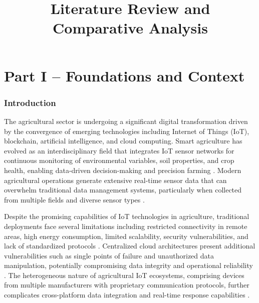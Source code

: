 \documentclass[12pt,onecolumn]{IEEEtran} %
\title{Literature Review and Comparative Analysis}
\begin{document}
\maketitle


\tableofcontents
\clearpage










\part*{Part I – Foundations and Context}

\section{Introduction}\label{sec:introduction}
The agricultural sector is undergoing a significant digital transformation driven by the convergence of emerging technologies including Internet of Things (IoT), blockchain, artificial intelligence, and cloud computing. Smart agriculture has evolved as an interdisciplinary field that integrates IoT sensor networks for continuous monitoring of environmental variables, soil properties, and crop health, enabling data-driven decision-making and precision farming \cite{dhanaraju2022smartfarminginternet, akhter2022precisionagricultureusing}. Modern agricultural operations generate extensive real-time sensor data that can overwhelm traditional data management systems, particularly when collected from multiple fields and diverse sensor types \cite{huang2025digitaltraceabilityin, irfan2025aniotdrivensmart}.

Despite the promising capabilities of IoT technologies in agriculture, traditional deployments face several limitations including restricted connectivity in remote areas, high energy consumption, limited scalability, security vulnerabilities, and lack of standardized protocols \cite{bayih2022utilizationofinternet, quy2022iotenabledsmartagriculture, jaliyagoda2023internetofthings}. Centralized cloud architectures present additional vulnerabilities such as single points of failure and unauthorized data manipulation, potentially compromising data integrity and operational reliability \cite{aliyu2023blockchainbasedsmartfarm}. The heterogeneous nature of agricultural IoT ecosystems, comprising devices from multiple manufacturers with proprietary communication protocols, further complicates cross-platform data integration and real-time response capabilities \cite{irfan2025aniotdrivensmart, abdurrohim2024blockchainbasedframeworkfor}.
\end{document}
